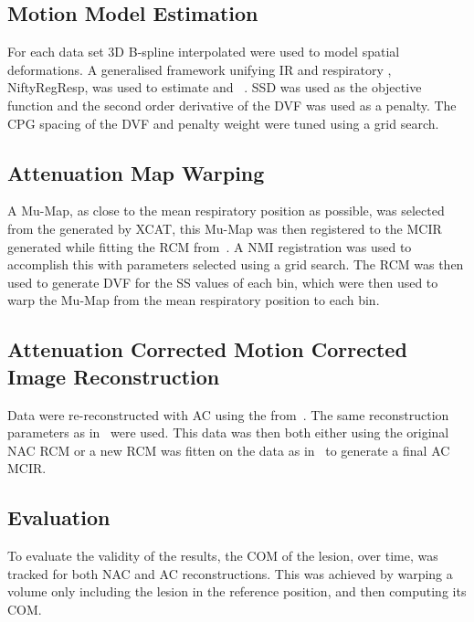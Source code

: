     \subsection{Motion Model Estimation} \label{sec:motion_model_estimation}
        For each data set \gls{3D} B-spline interpolated  were used to model spatial deformations. A generalised framework unifying \gls{IR} and respiratory , NiftyRegResp, was used to estimate  and ~\cite{McClelland2017}. \gls{SSD} was used as the objective function and the second order derivative of the \gls{DVF} was used as a penalty. The \gls{CPG} spacing of the \gls{DVF} and penalty weight were tuned using a grid search.
    
    \subsection{Attenuation Map Warping} \label{sec:attenuation_map_warping}
        A \gls{Mu-Map}, as close to the mean respiratory position as possible, was selected from the  generated by \gls{XCAT}, this \gls{Mu-Map} was then registered to the \gls{MCIR} generated while fitting the \gls{RCM} from~. A \gls{NMI} registration was used to accomplish this with parameters selected using a grid search. The \gls{RCM} was then used to generate \gls{DVF} for the \gls{SS} values of each bin, which were then used to warp the \gls{Mu-Map} from the mean respiratory position to each bin.
        
    \subsection{Attenuation Corrected Motion Corrected Image Reconstruction} \label{sec:attenuation_corrected_image_reconstruction}
        Data were re-reconstructed with \gls{AC} using the  from~. The same reconstruction parameters as in~ were used. This data was then both either  using the original \gls{NAC} \gls{RCM} or a new \gls{RCM} was fitten on the  data as in~ to generate a final \gls{AC} \gls{MCIR}.
    
    \subsection{Evaluation} \label{sec:evaluation}
        To evaluate the validity of the  results, the \gls{COM} of the lesion, over time, was tracked for both \gls{NAC} and \gls{AC} reconstructions. This was achieved by warping a volume only including the lesion in the reference position, and then computing its \gls{COM}.
        
